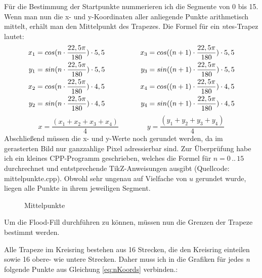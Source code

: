 	Für die Bestimmung der Startpunkte nummerieren ich die Segmente von 0 bis 15. Wenn man nun die x- und y-Koordinaten aller anliegende Punkte arithmetisch mittelt, erhält man den Mittelpunkt des Trapezes. Die Formel für ein \textit{n}tes-Trapez lautet:
	\begin{gather}
	\begin{split}
		x_1 &= cos(n \cdot \frac{22,5\pi}{180}) \cdot 5,5 \\
		y_1 &= sin(n \cdot \frac{22,5\pi}{180}) \cdot 5,5 \\ \vspace{2em}
		x_2 &= cos(n \cdot \frac{22,5\pi}{180}) \cdot 4,5 \\
		y_2 &= sin(n \cdot \frac{22,5\pi}{180}) \cdot 4,5
	\end{split}
	\hspace{5em}
	\begin{split}
		x_3 &= cos((n+1) \cdot \frac{22,5\pi}{180}) \cdot 5,5 \\
		y_3 &= sin((n+1) \cdot \frac{22,5\pi}{180}) \cdot 5,5 \\ \vspace{2em}
		x_4 &= cos((n+1) \cdot \frac{22,5\pi}{180}) \cdot 4,5 \\
		y_4 &= sin((n+1) \cdot \frac{22,5\pi}{180}) \cdot 4,5
	\end{split} \label{eq:nKoords}
	\end{gather}
	\begin{equation}
	x = \frac{(x_1+x_2+x_3+x_4)}{4} \hspace{4em} y = \frac{(y_1+y_2+y_3+y_4)}{4}
	\end{equation}
	Abschließend müssen die x- und y-Werte noch gerundet werden, da im gerasterten Bild nur ganzzahlige Pixel adressierbar sind.
	Zur Überprüfung habe ich ein kleines CPP-Programm geschrieben, welches die Formel für \(n = 0\hspace{2pt}..\hspace{2pt}15 \) durchrechnet und entstprechende TikZ-Anweisungen ausgibt (Quellcode: mittelpunkte.cpp). Obwohl sehr ungenau auf Vielfache von \(u\) gerundet wurde, liegen alle Punkte in ihrem jeweiligen Segment.
	\begin{figure}[!ht]
		\centering
		
		\caption{Mittelpunkte}
	\end{figure}

	Um die Flood-Fill durchführen zu können, müssen nun die Grenzen der Trapeze bestimmt werden. 

	Alle Trapeze im Kreisring bestehen aus 16 Strecken, die den Kreisring einteilen sowie 16 obere- wie untere Strecken. Daher muss ich in die Grafiken für jedes \textit{n} folgende Punkte aus Gleichung \eqref{eq:nKoords} verbinden.:
	

